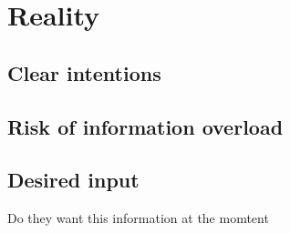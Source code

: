 \chapter{Reality}

\section{Clear intentions}

\section{Risk of information overload}

\section{Desired input}
Do they want this information at the momtent 